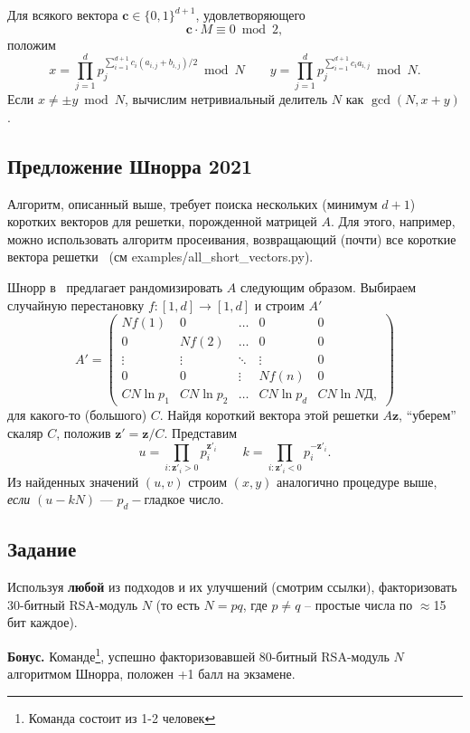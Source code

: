 \documentclass[11pt]{exam}
\theoremstyle{definition}
\newcommand{\zvec}{\ensuremath{\mathbf{z}}}
\begin{document}
{	Для всякого вектора $\mathbf{c} \in \{0,1\}^{d+1}$, удовлетворяющего
	\[
		\mathbf{c}  \cdot M \equiv 0 \bmod 2, 
	\]
	положим
	\[
	 	x = \prod_{j=1}^d p_j^{\sum_{i=1}^{d+1} c_i (a_{i,j}+b_{i,j})/2} \bmod N \quad \quad	y = \prod_{j=1}^d p_j^{\sum_{i=1}^{d+1} c_i a_{i,j} } \bmod N.
	\]
 	Если $x \neq \pm y \bmod N$, вычислим нетривиальный делитель $N$ как $\gcd(N, x+y)$.
 	
	\subsection{Предложение Шнорра 2021}
	Алгоритм, описанный выше, требует поиска нескольких (минимум $d+1$) коротких векторов для решетки, порожденной матрицей $A$. Для этого, например, можно использовать алгоритм просеивания, возвращающий (почти) все короткие вектора решетки~\cite{g6k} (см \textsf{examples/all\_short\_vectors.py}).
	
	Шнорр в~\cite{Schnorr21} предлагает рандомизировать $A$ следующим образом. Выбираем случайную перестановку $f:[1,d] \rightarrow [1,d] $ и строим $A'$
	\[
	A' = 
	\begin{pmatrix}
		N f(1) & 0 &  \ldots & 0 & 0 \\
		0 & N f(2) & \ldots & 0 & 0 \\
		\vdots & \vdots & \ddots & \vdots & 0 \\
		0 & 0 & \vdots & N f(n)  & 0 \\
		C N \ln p_1 &C  N \ln p_2 & \ldots & C N \ln p_d & CN \ln NД,
	\end{pmatrix}
	\]
	для какого-то (большого) $C$. Найдя короткий вектора этой решетки $A\zvec$, ``уберем'' скаляр $C$, положив $\zvec' = \zvec / C$. Представим
	\[
		u = \prod_{i: \zvec'_i >0} p_i^{\zvec'_i} \quad \quad k = \prod_{i: \zvec'_i <0} p_i^{-\zvec'_i}.
	\] 
	Из найденных значений $(u,v)$ строим $(x,y)$ аналогично процедуре выше, \emph{если} $(u - kN)$ --- $p_d-$гладкое число.


	
	
	\subsection{Задание}
	
	Используя \textbf{любой} из подходов и их улучшений (смотрим ссылки), факторизовать 30-битный RSA-модуль $N$ (то есть $N = pq$, где $p \neq q$ -- простые числа по $\approx$15 бит каждое).
	
	\textbf{Бонус.} Команде\footnote{Команда состоит из 1-2 человек},  успешно факторизовавшей 80-битный RSA-модуль $N$ алгоритмом Шнорра, положен +1 балл на экзамене.
	
}
\end{document}
